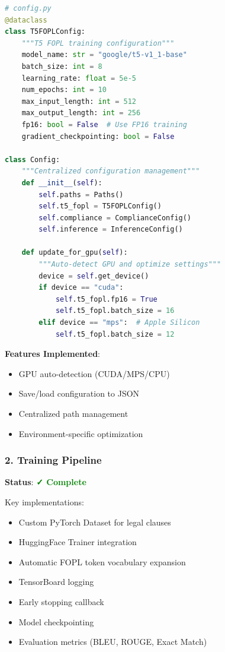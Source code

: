 \documentclass[12pt,a4paper]{article}
\begin{document}
\begin{lstlisting}[language=Python, caption=Configuration System]
# config.py
@dataclass
class T5FOPLConfig:
    """T5 FOPL training configuration"""
    model_name: str = "google/t5-v1_1-base"
    batch_size: int = 8
    learning_rate: float = 5e-5
    num_epochs: int = 10
    max_input_length: int = 512
    max_output_length: int = 256
    fp16: bool = False  # Use FP16 training
    gradient_checkpointing: bool = False

class Config:
    """Centralized configuration management"""
    def __init__(self):
        self.paths = Paths()
        self.t5_fopl = T5FOPLConfig()
        self.compliance = ComplianceConfig()
        self.inference = InferenceConfig()
    
    def update_for_gpu(self):
        """Auto-detect GPU and optimize settings"""
        device = self.get_device()
        if device == "cuda":
            self.t5_fopl.fp16 = True
            self.t5_fopl.batch_size = 16
        elif device == "mps":  # Apple Silicon
            self.t5_fopl.batch_size = 12
\end{lstlisting}

\textbf{Features Implemented}:
\begin{itemize}
    \item GPU auto-detection (CUDA/MPS/CPU)
    \item Save/load configuration to JSON
    \item Centralized path management
    \item Environment-specific optimization
\end{itemize}

\subsubsection{2. Training Pipeline}

\textbf{Status}: \textcolor{green}{\textbf{✓ Complete}}

Key implementations:
\begin{itemize}
    \item Custom PyTorch Dataset for legal clauses
    \item HuggingFace Trainer integration
    \item Automatic FOPL token vocabulary expansion
    \item TensorBoard logging
    \item Early stopping callback
    \item Model checkpointing
    \item Evaluation metrics (BLEU, ROUGE, Exact Match)
\end{itemize}
\end{document}
